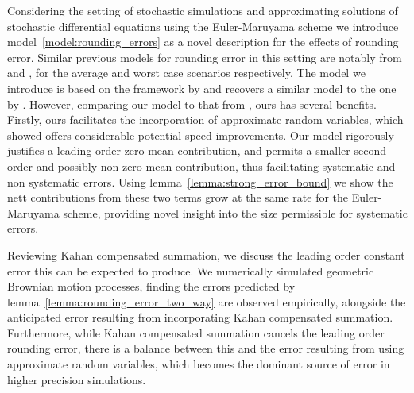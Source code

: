 \documentclass[manuscript,review]{acmart}
\begin{document}
Considering the setting of stochastic simulations and approximating solutions of stochastic differential equations using the Euler-Maruyama scheme we introduce model~\ref{model:rounding_errors} as a novel description for the effects of rounding error. Similar previous models for rounding error in this setting are notably from \citet{arciniega2003rounding} and \citet{omland2016mixed}, for the average and worst case scenarios respectively. The model we introduce is based on the framework by \citet{omland2016mixed} and recovers a similar model to the one by \citet{arciniega2003rounding}. However, comparing our model to that from \citet{arciniega2003rounding}, ours has several benefits. Firstly, ours facilitates the incorporation of approximate random variables, which \citet{giles2020approximating} showed offers considerable potential speed improvements. Our model rigorously justifies a leading order zero mean contribution, and permits a smaller second order and possibly non zero mean contribution, thus facilitating systematic and non systematic errors. Using lemma~\ref{lemma:strong_error_bound} we show the nett contributions from these two terms grow at the same rate for the Euler-Maruyama scheme, providing novel insight into the size permissible for systematic errors. 

Reviewing Kahan compensated summation, we discuss the leading order constant error this can be expected to produce. We numerically simulated geometric Brownian motion processes, finding the errors predicted by lemma~\ref{lemma:rounding_error_two_way} are observed empirically, alongside the anticipated error resulting from incorporating Kahan compensated summation. Furthermore, while Kahan compensated summation cancels the leading order rounding error, there is a balance between this and the error resulting from using approximate random variables, which becomes the dominant source of error in higher precision simulations. 
\end{document}
